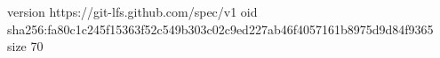 version https://git-lfs.github.com/spec/v1
oid sha256:fa80c1c245f15363f52c549b303c02c9ed227ab46f4057161b8975d9d84f9365
size 70
